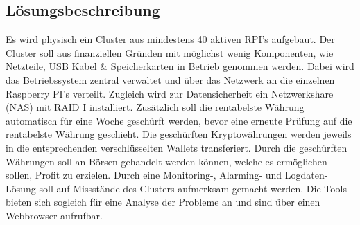
\subsection{Lösungsbeschreibung}
Es wird physisch ein Cluster aus mindestens 40 aktiven RPI's aufgebaut. Der Cluster soll aus finanziellen Gründen mit möglichst wenig Komponenten, wie Netzteile, USB Kabel \& Speicherkarten in Betrieb genommen werden. Dabei wird das Betriebssystem zentral verwaltet und über das Netzwerk an die einzelnen Raspberry PI's verteilt. Zugleich wird zur Datensicherheit ein Netzwerkshare (NAS) mit RAID I installiert. Zusätzlich soll die rentabelste Währung automatisch für eine Woche geschürft werden, bevor eine erneute Prüfung auf die rentabelste Währung geschieht. Die geschürften Kryptowährungen werden jeweils in die entsprechenden verschlüsselten Wallets transferiert. Durch die geschürften Währungen soll an Börsen gehandelt werden können, welche es ermöglichen sollen, Profit zu erzielen. Durch eine Monitoring-, Alarming- und Logdaten-Lösung soll auf Missstände des Clusters aufmerksam gemacht werden. Die Tools bieten sich sogleich für eine Analyse der Probleme an und sind über einen Webbrowser aufrufbar.   